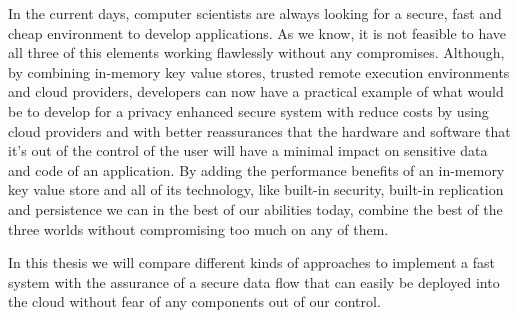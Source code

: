 In the current days, computer scientists are always looking for a secure, fast and cheap environment to develop applications. As we know, it is not feasible to have all three of this elements working flawlessly without any compromises. Although, by combining in-memory key value stores, trusted remote execution environments and cloud providers, developers can now have a practical example of what would be to develop for a privacy enhanced secure system with reduce costs by using cloud providers and with better reassurances that the hardware and software that it's out of the control of the user will have a minimal impact on sensitive data and code of an application. By adding the performance benefits of an in-memory key value store and all of its technology, like built-in security, built-in replication and persistence we can in the best of our abilities today, combine the best of the three worlds without compromising too much on any of them.

In this thesis we will compare different kinds of approaches to implement a fast system with the assurance of a secure data flow that can easily be deployed into the cloud without fear of any components out of our control.